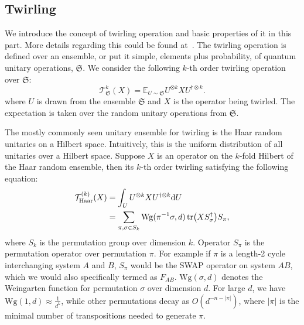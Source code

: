 \documentclass[onecolumn,prx,longbibliography,nofootinbib, superscriptaddress]{revtex4-2}
\theoremstyle{recap}
\begin{document}
\subsection{Twirling}\label{appendix:twirling}
We introduce the concept of twirling operation and basic properties of it in this part. More details regarding this could be found at~\cite{Mele2024introductiontohaar}. The twirling operation is defined over an ensemble, or put it simple, elements plus probability, of quantum unitary operations, $\mathfrak{S}$. We consider the following $k$-th order twirling operation over $\mathfrak{S}$:
\begin{equation}
\mathcal{T}^k_{\mathfrak{S}}(X) = \mathbb{E}_{U\sim\mathfrak{S}} U^{\otimes k}X U^{\dagger\otimes k}.
\end{equation}
where $U$ is drawn from the ensemble $\mathfrak{S}$ and $X$ is the operator being twirled. The expectation is taken over the random unitary operations from $\mathfrak{S}$.

The mostly commonly seen unitary ensemble for twirling is the Haar random unitaries on a Hilbert space. Intuitively, this is the uniform distribution of all unitaries over a Hilbert space. Suppose $X$ is an operator on the $k$-fold Hilbert of the Haar random ensemble, then its $k$-th order twirling satisfying the following equation:
\begin{equation}
\begin{split}
    \mathcal{T}_{\mathrm{Haar}}^{(k)}(X)&=\int_{U}U^{\otimes k}XU^{\dagger\otimes k}\mathrm{d}U\\
    &=\sum_{\pi,\sigma\in S_k}\mathrm{Wg}(\pi^{-1}\sigma, d)\tr(XS_{\sigma}^{\dagger})S_{\pi},
\end{split}
\end{equation}
where $S_{k}$ is the permutation group over dimension $k$. Operator $S_{\pi}$ is the permutation operator over permutation $\pi$. For example if $\pi$ is a length-2 cycle interchanging system $A$ and $B$, $S_{\pi}$ would be the SWAP operator on system $AB$, which we would also specifically termed as $F_{AB}$. $\textrm{Wg}(\sigma, d)$ denotes the Weingarten function for permutation $\sigma$ over dimension $d$. For large $d$, we have $\mathrm{Wg}(1, d)\approx\frac{1}{d^{k}}$, while other permutations decay as $O(d^{-n - | \pi |})$, where $| \pi |$ is the minimal number of transpositions needed to generate $\pi$.
\end{document}
